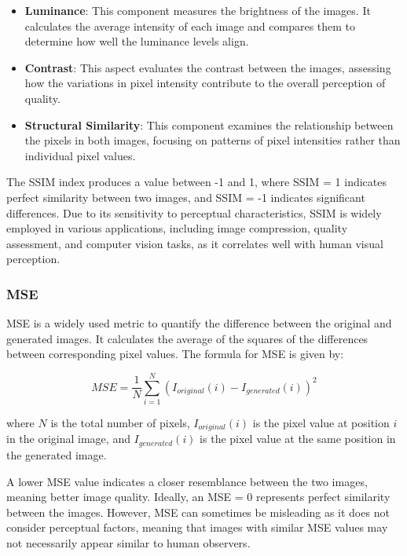 \documentclass[12pt,DIV14,BCOR12mm,a4paper,footinclude=false,headinclude,parskip=half-,twoside,openright,cleardoublepage=empty,toc=index,bibliography=totoc,listof=totoc]{scrreprt}
\numberwithin{equation}{chapter}
\begin{document}
\begin{itemize}
    \item \textbf{Luminance}: This component measures the brightness of the images. It calculates the average intensity of each image and compares them to determine how well the luminance levels align.
    
    \item \textbf{Contrast}: This aspect evaluates the contrast between the images, assessing how the variations in pixel intensity contribute to the overall perception of quality.
    
    \item \textbf{Structural Similarity}: This component examines the relationship between the pixels in both images, focusing on patterns of pixel intensities rather than individual pixel values.
\end{itemize}

The SSIM index produces a value between -1 and 1, where SSIM = 1 indicates perfect similarity between two images, and SSIM = -1 indicates significant differences. Due to its sensitivity to perceptual characteristics, SSIM is widely employed in various applications, including image compression, quality assessment, and computer vision tasks, as it correlates well with human visual perception.

\subsubsection{MSE}
MSE is a widely used metric to quantify the difference between the original and generated images. It calculates the average of the squares of the differences between corresponding pixel values. The formula for MSE is given by:

\begin{equation}
MSE = \frac{1}{N} \sum_{i=1}^{N} (I_{original}(i) - I_{generated}(i))^2
\end{equation}

where \( N \) is the total number of pixels, \( I_{original}(i) \) is the pixel value at position \( i \) in the original image, and \( I_{generated}(i) \) is the pixel value at the same position in the generated image.

A lower MSE value indicates a closer resemblance between the two images, meaning better image quality. Ideally, an MSE = 0 represents perfect similarity between the images. However, MSE can sometimes be misleading as it does not consider perceptual factors, meaning that images with similar MSE values may not necessarily appear similar to human observers.
\end{document}
